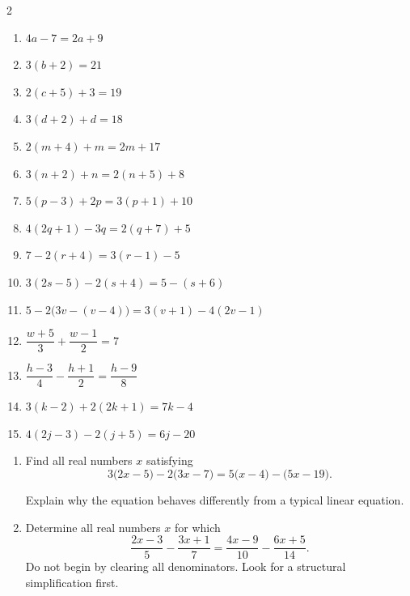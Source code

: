 \begin{multicols}{2}
\begin{enumerate}[label=\textbf{\arabic*.},start=9]
			\item $4a-7=2a+9$
			
			\item $3(b+2)=21$
			
			\item $2(c+5)+3=19$
			
			\item $3(d+2)+d=18$
			
			\item $2(m+4)+m=2m+17$
			
			\item $3(n+2)+n=2(n+5)+8$
			
			\item $5(p-3)+2p=3(p+1)+10$
			
			\item $4(2q+1)-3q=2(q+7)+5$
			
			\item $7-2(r+4)=3(r-1)-5$
			
			\item $3(2s-5)-2(s+4)=5-(s+6)$
			
			\item $5-2\bigl(3v-(v-4)\bigr)
			=3(v+1)-4(2v-1)$
			
			\item $\dfrac{w+5}{3}+\dfrac{w-1}{2}=7$
			
			\item $\dfrac{h-3}{4}-\dfrac{h+1}{2}
			=\dfrac{h-9}{8}$
			
			\item $3(k-2)+2(2k+1)=7k-4$
			
			\item $4(2j-3)-2(j+5)=6j-20$
		\end{enumerate}
		
		\begin{enumerate}[label=\textbf{\arabic*.}]
			
			\item Find all real numbers $x$ satisfying \vspace{-3mm}
			\[
			3\bigl(2x-5\bigr)-2\bigl(3x-7\bigr)
			=
			5\bigl(x-4\bigr)-\bigl(5x-19\bigr).
			\]
			
			\vspace{-3mm}
			Explain why the equation behaves differently from a typical linear equation.
			
			\item Determine all real numbers $x$ for which
			\[
			\frac{2x-3}{5}
			-\frac{3x+1}{7}
			=
			\frac{4x-9}{10}
			-\frac{6x+5}{14}.
			\]
			Do not begin by clearing all denominators. Look for a structural simplification first.
			

\end{enumerate}
\end{multicols}
